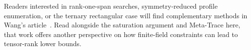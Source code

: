 Readers interested in rank-one-span searches, symmetry-reduced profile
enumeration, or the ternary rectangular case will find complementary
methods in Wang's article~\cite{wang2026twentyone}. Read alongside the
saturation argument and Meta-Trace here, that work offers another
perspective on how finite-field constraints can lead to tensor-rank
lower bounds.
